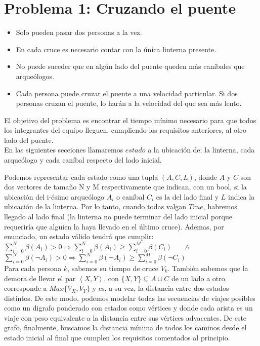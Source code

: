 \section{Problema 1: Cruzando el puente}


            \begin{itemize}
                \item Solo pueden pasar dos personas a la vez.
                \item En cada cruce es necesario contar con la única linterna presente.
                \item No puede suceder que en algún lado del puente queden más caníbales que arqueólogos.
                \item Cada persona puede cruzar el puente a una velocidad particular. Si dos personas cruzan el puente, lo harán a la velocidad del que sea más lento.
            \end{itemize}

        El objetivo del problema es encontrar el tiempo mínimo necesario para que todos los integrantes del equipo lleguen, cumpliendo los requisitos anteriores, al otro lado del puente.
        \\

        En las siguientes secciones llamaremos $estado$ a la ubicación de: la linterna, cada arqueólogo y cada caníbal respecto del lado inicial.

        Podemos representar cada estado como una tupla $(A,C,L)$, donde $A$ y $C$ son dos vectores de tamaño N y M respectivamente que indican, con un bool, si la ubicación del i-ésimo arqueólogo $A_i$ o caníbal $C_i$ es la del lado final y $L$  indica la ubicación de la linterna. Por lo tanto, cuando todas valgan $True$, habremos llegado al lado final (la linterna no puede terminar del lado inicial porque requeriría que alguien la haya llevado en el último cruce). Ademas, por enunciado, un estado válido tendrá que cumplir:
        \\

        $\sum_{i=0}^{N}\beta(A_i) > 0 \Rightarrow \sum_{i=0}^{N}\beta(A_i) \ge \sum_{i=0}^{M}\beta(C_i)  $
        \ \ \
        $\wedge$
        \ \ \
        $\sum_{i=0}^{N}\beta(\neg A_i) > 0 \Rightarrow \sum_{i=0}^{N}\beta(\neg A_i) \ge \sum_{i=0}^{M}\beta(\neg C_i)$
        \\

        Para cada persona $k$, sabemos su tiempo de cruce $V_k$. También sabemos que la demora de llevar el par $\left \langle {X, Y} \right \rangle$, con $\{X,Y\} \subseteq A \cup C$ de un lado a otro corresponde a $Max\{ V_{X}, V_{Y}  \}$ y es, a su vez, la distancia entre dos estados distintos. De este modo, podemos modelar todas las secuencias de viajes posibles como un digrafo ponderado con estados como vértices y donde cada arista es un viaje con peso equivalente a la distancia entre sus vértices adyacentes. De este grafo, finalmente, buscamos la distancia mínima de todos los caminos desde el estado inicial al final que cumplen los requisitos comentados al principio.
        \\
        
